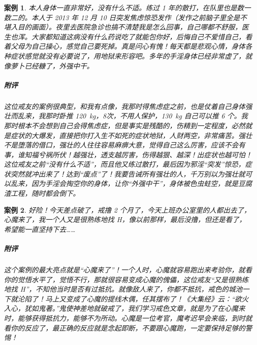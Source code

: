 \documentclass{ctexart}
\newtheorem{case}{案例}
\begin{document}
\begin{case}
    本人身体一直非常好，没有什么不适。练过 1 年的散打，在队里也是数一数二的。本人于 2013 年 12 月 10 日突发焦虑惊恐发作（发作之前脑子里全是不堪入目的画面）。夜里去医院急诊也搞不清楚我是怎么回事，自己哪都不舒服，医生也浑。大家都知道这病没有什么药说吃了就能包你好，后悔自己不爱惜自己，看着父母为自己操心，感觉自己要死掉。真是问心有愧！每天都是悲观心情，身体各种症状感觉就没有必要说了，用地狱来形容吧。多年的手淫身体已经非常虚了，就像萝卜已经糠了，外强中干。
    \subparagraph{附评} 这位戒友的案例很典型，和我有点像，我那时得焦虑症之前，也是仗着自己身体强壮而乱来，我那时卧推 \SI{120}{\kilo\gram}，8次，不用人保护，\SI{130}{\kilo\gram} 自己可以推 6 个。我那时根本不会想到自己会得焦虑症，但是事实是残酷的，伤精到一定程度，必然就是症状的大爆发，直接把你打入生不如死的症状地狱，人财两空，非常痛苦。强壮不是堕落的借口，强壮的人往往容易麻痹大意，觉得自己这么厉害，应该不会有事，谁知福兮祸所伏！越强壮，透支越厉害，伤得越狠、越深！出症状也越可怕！这位戒友之前“没有什么不适”，而且他又练过散打，最后因为邪淫“突发”惊恐，症状突然就冲出来了！达到“废点”了！我要告诫所有强壮的人，千万别以为强壮就可以乱来，因为手淫会掏空你的身体，让你“外强中干”，身体被色虫蛀空，就是豆腐渣工程，随时都会倒下。
\end{case}

\begin{case}
    好险！今天差点破了，戒撸 2 个月了，今天上班办公室里的人都出去了，心魔来了，我一个人又是很熟练地找 H，像以前那样，最后没撸，但还是看了，希望能一直坚持下去……
    \subparagraph{附评} 这个案例的最大亮点就是“心魔来了”！一个人时，心魔就容易跑出来考验你，就看你的觉悟水平了，觉悟不行，那就很容易变成心魔的傀儡，这位戒友“又是很熟练地找 H”，不知他当时是否有过抵抗。就像敌人来了，你都不抵抗，戒色的城池一下就沦陷了！马上又变成了心魔的提线木偶，任其摆布了！《大集经》云：“欲火入心，犹如鬼著。”鬼使神差地就破戒了，我们学习戒色文章，就是为了在心魔来时，能够获得抵抗力，能够不为所动。心魔是一位考官，魔考迟早会来临，到时就看你的反应了，最正确的反应就是念起即断，不要跟心魔跑，一定要保持足够的警惕！
\end{case}
\end{document}
